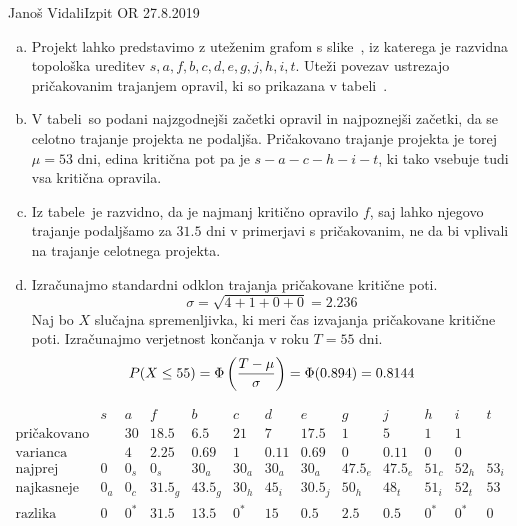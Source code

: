 \begin{naloga}{Janoš Vidali}{Izpit OR 27.8.2019}
\begin{odgovor}
\begin{enumerate}[(a)]
\item Projekt lahko predstavimo z uteženim grafom s slike~\fig,
iz katerega je razvidna topološka ureditev
$s, a, f, b, c, d, e, g, j, h, i, t$.
Uteži povezav ustrezajo pričakovanim trajanjem opravil,
ki so prikazana v tabeli~.

\item V tabeli~
so podani najzgodnejši začetki opravil in najpoznejši začetki,
da se celotno trajanje projekta ne podaljša.
Pričakovano trajanje projekta je torej $\mu = 53$ dni,
edina kritična pot pa je $s - a - c - h - i - t$,
ki tako vsebuje tudi vsa kritična opravila.

\item Iz tabele~ je razvidno,
da je najmanj kritično opravilo $f$,
saj lahko njegovo trajanje
podaljšamo za $31.5$ dni v primerjavi s pričakovanim,
ne da bi vplivali na trajanje celotnega projekta.

\item Izračunajmo standardni odklon trajanja pričakovane kritične poti.
$$
\sigma = \sqrt{4 + 1 + 0 + 0} = 2.236
$$
Naj bo $X$ slučajna spremenljivka,
ki meri čas izvajanja pričakovane kritične poti.
Izračunajmo verjetnost končanja v roku $T = 55$ dni.
$$
P(X \le 55) = \Phi\left({T - \mu \over \sigma}\right) = \Phi(0.894) = 0.8144
$$
\end{enumerate}
%
\begin{slika}
\makebox[\textwidth][c]{
\pgfslika
}
\end{slika}
%
\begin{tabela}
$$
\begin{array}{c|cccccccccccc}
& s & a & f & b & c & d & e & g & j & h & i & t \\ \hline
\text{pričakovano} && 30 & 18.5 & 6.5 & 21 & 7 & 17.5 & 1 & 5 & 1 & 1 \\
\text{varianca} && 4 & 2.25 & 0.69 & 1 & 0.11 & 0.69 & 0 & 0.11 & 0 & 0 \\
\hline
\text{najprej} & 0 & 0_s & 0_s & 30_a & 30_a & 30_a & 30_a & 47.5_e & 47.5_e & 51_c & 52_h & 53_i \\
\text{najkasneje} & 0_a & 0_c & 31.5_g & 43.5_g & 30_h & 45_i & 30.5_j & 50_h & 48_t & 51_i & 52_t & 53 \\
\text{razlika} & 0 & 0^* & 31.5 & 13.5 & 0^* & 15 & 0.5 & 2.5 & 0.5 & 0^* & 0^* & 0
\end{array}
$$
\end{tabela}
\end{odgovor}
\end{naloga}
